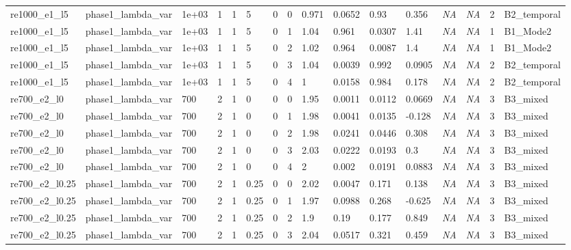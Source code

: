 \documentclass[11pt,a4paper]{article}
\begin{document}
\begin{landscape}
\begin{longtable}{*{16}{l}}
    re1000\_e1\_l5 & phase1\_lambda\_var & 1e+03 & 1 & 1 & 5 & 0 & 0 & 0.971 & 0.0652 & 0.93 & 0.356 & \textit{NA} & \textit{NA} & 2 & B2\_temporal \\
    re1000\_e1\_l5 & phase1\_lambda\_var & 1e+03 & 1 & 1 & 5 & 0 & 1 & 1.04 & 0.961 & 0.0307 & 1.41 & \textit{NA} & \textit{NA} & 1 & B1\_Mode2 \\
    re1000\_e1\_l5 & phase1\_lambda\_var & 1e+03 & 1 & 1 & 5 & 0 & 2 & 1.02 & 0.964 & 0.0087 & 1.4 & \textit{NA} & \textit{NA} & 1 & B1\_Mode2 \\
    re1000\_e1\_l5 & phase1\_lambda\_var & 1e+03 & 1 & 1 & 5 & 0 & 3 & 1.04 & 0.0039 & 0.992 & 0.0905 & \textit{NA} & \textit{NA} & 2 & B2\_temporal \\
    re1000\_e1\_l5 & phase1\_lambda\_var & 1e+03 & 1 & 1 & 5 & 0 & 4 & 1 & 0.0158 & 0.984 & 0.178 & \textit{NA} & \textit{NA} & 2 & B2\_temporal \\
    re700\_e2\_l0 & phase1\_lambda\_var & 700 & 2 & 1 & 0 & 0 & 0 & 1.95 & 0.0011 & 0.0112 & 0.0669 & \textit{NA} & \textit{NA} & 3 & B3\_mixed \\
    re700\_e2\_l0 & phase1\_lambda\_var & 700 & 2 & 1 & 0 & 0 & 1 & 1.98 & 0.0041 & 0.0135 & -0.128 & \textit{NA} & \textit{NA} & 3 & B3\_mixed \\
    re700\_e2\_l0 & phase1\_lambda\_var & 700 & 2 & 1 & 0 & 0 & 2 & 1.98 & 0.0241 & 0.0446 & 0.308 & \textit{NA} & \textit{NA} & 3 & B3\_mixed \\
    re700\_e2\_l0 & phase1\_lambda\_var & 700 & 2 & 1 & 0 & 0 & 3 & 2.03 & 0.0222 & 0.0193 & 0.3 & \textit{NA} & \textit{NA} & 3 & B3\_mixed \\
    re700\_e2\_l0 & phase1\_lambda\_var & 700 & 2 & 1 & 0 & 0 & 4 & 2 & 0.002 & 0.0191 & 0.0883 & \textit{NA} & \textit{NA} & 3 & B3\_mixed \\
    re700\_e2\_l0.25 & phase1\_lambda\_var & 700 & 2 & 1 & 0.25 & 0 & 0 & 2.02 & 0.0047 & 0.171 & 0.138 & \textit{NA} & \textit{NA} & 3 & B3\_mixed \\
    re700\_e2\_l0.25 & phase1\_lambda\_var & 700 & 2 & 1 & 0.25 & 0 & 1 & 1.97 & 0.0988 & 0.268 & -0.625 & \textit{NA} & \textit{NA} & 3 & B3\_mixed \\
    re700\_e2\_l0.25 & phase1\_lambda\_var & 700 & 2 & 1 & 0.25 & 0 & 2 & 1.9 & 0.19 & 0.177 & 0.849 & \textit{NA} & \textit{NA} & 3 & B3\_mixed \\
    re700\_e2\_l0.25 & phase1\_lambda\_var & 700 & 2 & 1 & 0.25 & 0 & 3 & 2.04 & 0.0517 & 0.321 & 0.459 & \textit{NA} & \textit{NA} & 3 & B3\_mixed \\

\end{longtable}
\end{landscape}
\end{document}

